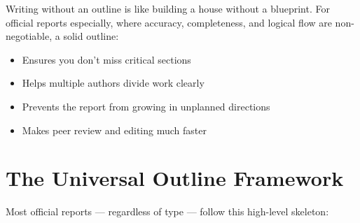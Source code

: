 \documentclass[11pt,a4paper,oneside]{book}
\begin{document}
Writing without an outline is like building a house without a blueprint. For official reports especially, where accuracy, completeness, and logical flow are non-negotiable, a solid outline:

\begin{itemize}
    \item Ensures you don't miss critical sections
    \item Helps multiple authors divide work clearly
    \item Prevents the report from growing in unplanned directions
    \item Makes peer review and editing much faster
\end{itemize}

\section{The Universal Outline Framework}

Most official reports --- regardless of type --- follow this high-level skeleton:
\end{document}
